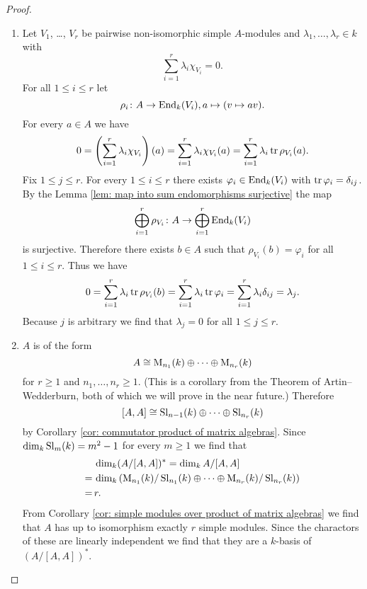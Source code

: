 \begin{proof}
 \begin{enumerate}[label=\emph{\alph*})]
  \item
   Let $V_1$, \dots, $V_r$ be pairwise non-isomorphic simple $A$-modules and $\lambda_1, \dotsc, \lambda_r \in k$ with
   \[
    \sum_{i=1}^r \lambda_i \chi_{V_i} = 0.
   \]
   For all $1 \leq i \leq r$ let
   \[
    \rho_i \colon A \to \operatorname{End}_k(V_i), a \mapsto (v \mapsto av).
   \]
   For every $a \in A$ we have
   \[
    0
    = \left( \sum_{i=1}^r \lambda_i \chi_{V_i} \right)(a)
    = \sum_{i=1}^r \lambda_i \chi_{V_i}(a)
    = \sum_{i=1}^r \lambda_i \operatorname{tr} \rho_{V_i}(a).
   \]
   Fix $1 \leq j \leq r$. For every $1 \leq i \leq r$ there exists $\varphi_i \in \operatorname{End}_k(V_i)$ with $\operatorname{tr} \varphi_i = \delta_{ij}$. By the Lemma \ref{lem: map into sum endomorphisms surjective} the map
   \[
    \bigoplus_{i=1}^r \rho_{V_i} \colon A \to \bigoplus_{i=1}^r \operatorname{End}_k(V_i)
   \]
   is surjective. Therefore there exists $b \in A$ such that $\rho_{V_i}(b) = \varphi_i$ for all $1 \leq i \leq r$. Thus we have
   \[
    0
    = \sum_{i=1}^r \lambda_i \operatorname{tr} \rho_{V_i}(b)
    = \sum_{i=1}^r \lambda_i \operatorname{tr} \varphi_i
    = \sum_{i=1}^r \lambda_i \delta_{ij}
    = \lambda_j.
   \]
   Because $j$ is arbitrary we find that $\lambda_j = 0$ for all $1 \leq j \leq r$.
  \item
   $A$ is of the form 
   \[
    A \cong \operatorname{M}_{n_1}(k) \oplus \dotsb \oplus \operatorname{M}_{n_r}(k)
   \]
   for $r \geq 1$ and $n_1, \dotsc, n_r \geq 1$. (This is a corollary from the Theorem of Artin--Wedderburn, both of which we will prove in the near future.) Therefore
   \[
    [A,A] \cong \operatorname{Sl}_{n-1}(k) \oplus \dotsb \oplus \operatorname{Sl}_{n_r}(k)
   \]
   by Corollary \ref{cor: commutator product of matrix algebras}. Since $\dim_k \operatorname{Sl}_m(k) = m^2 - 1$ for every $m \geq 1$ we find that
   \begin{align*}
     &\, \dim_k (A/[A,A])^*
    =    \dim_k A/[A,A] \\
    =&\, \dim_k\left( \operatorname{M}_{n_1}(k)/\operatorname{Sl}_{n_1}(k) \oplus \dotsb \oplus \operatorname{M}_{n_r}(k)/\operatorname{Sl}_{n_r}(k) \right) \\
    =&\, r.
   \end{align*}
   From Corollary \ref{cor: simple modules over product of matrix algebras} we find that $A$ has up to isomorphism exactly $r$ simple modules. Since the charactors of these are linearly independent we find that they are a $k$-basis of $(A/[A,A])^*$.
  \qedhere
 \end{enumerate}
\end{proof}


